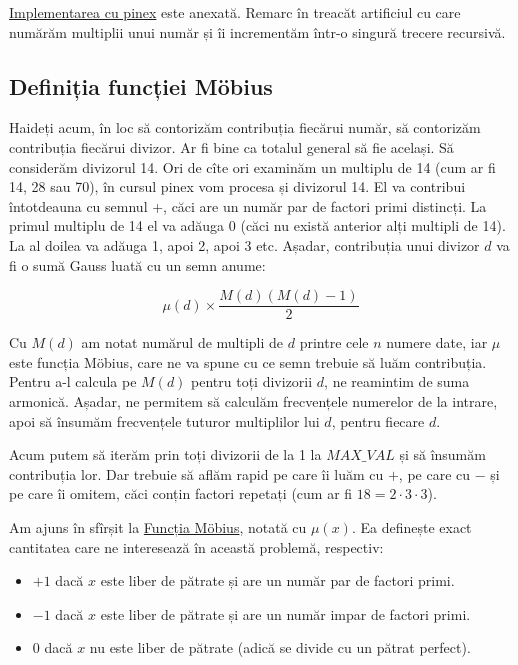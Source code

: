 \documentclass[../main.tex]{subfiles}
\begin{document}
\hyperref[code:counting-coprime-pairs]{Implementarea cu pinex} este anexată. Remarc în treacăt artificiul cu care numărăm multiplii unui număr și îi incrementăm într-o singură trecere recursivă.

\subsection{Definiția funcției Möbius}

Haideți acum, în loc să contorizăm contribuția fiecărui număr, să contorizăm contribuția fiecărui divizor. Ar fi bine ca totalul general să fie același.  Să considerăm divizorul 14. Ori de cîte ori examinăm un multiplu de 14 (cum ar fi 14, 28 sau 70), în cursul pinex vom procesa și divizorul 14. El va contribui întotdeauna cu semnul +, căci are un număr par de factori primi distincți. La primul multiplu de 14 el va adăuga 0 (căci nu există anterior alți multipli de 14). La al doilea va adăuga 1, apoi 2, apoi 3 etc. Așadar, contribuția unui divizor $d$ va fi o sumă Gauss luată cu un semn anume:

$$\mu(d) \times \frac{M(d)(M(d) - 1)}{2}$$

Cu $M(d)$ am notat numărul de multipli de $d$ printre cele $n$ numere date, iar $\mu$ este funcția Möbius, care ne va spune cu ce semn trebuie să luăm contribuția. Pentru a-l calcula pe $M(d)$ pentru toți divizorii $d$, ne reamintim de suma armonică. Așadar, ne permitem să calculăm frecvențele numerelor de la intrare, apoi să însumăm frecvențele tuturor multiplilor lui $d$, pentru fiecare $d$.

Acum putem să iterăm prin toți divizorii de la 1 la $MAX\_VAL$ și să însumăm contribuția lor. Dar trebuie să aflăm rapid pe care îi luăm cu $+$, pe care cu $-$ și pe care îi omitem, căci conțin factori repetați (cum ar fi $18 = 2 \cdot 3 \cdot 3$).

Am ajuns în sfîrșit la \href{https://en.wikipedia.org/wiki/M\%C3\%B6bius_function}{Funcția Möbius}, notată cu $\mu(x)$. Ea definește exact cantitatea care ne interesează în această problemă, respectiv:

\begin{itemize}
  \item $+1$ dacă $x$ este liber de pătrate și are un număr par de factori primi.

  \item $-1$ dacă $x$ este liber de pătrate și are un număr impar de factori primi.

  \item $0$ dacă $x$ nu este liber de pătrate (adică se divide cu un pătrat perfect).
\end{itemize}
\end{document}
